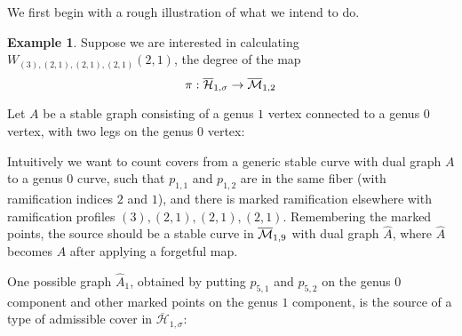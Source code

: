 \documentclass[thesis]{thesis-umich}           %
\newcommand{\Hb}{\overline{\mathcal H}}
\theoremstyle{definition}
\newtheorem{eg}[thm]{Example}
\begin{document}
We first begin with a rough illustration of what we intend to do.

\begin{eg}
  \label{eg:fourtorsion}
  Suppose we are interested in calculating $W_{(3),(2,1),(2,1),(2,1)}(2,1)$, the degree of the map
  \[
  \pi:\Hb_{1,\sigma}\to\mb_{1,2}
  \]
  
  Let $A$ be a stable graph consisting of a genus $1$ vertex connected to a genus $0$ vertex, with two legs on the
  genus $0$ vertex:

  

  Intuitively we want to count covers from a generic stable curve with dual graph $A$ to a genus $0$
  curve, such that $p_{1,1}$ and $p_{1,2}$ are in the same fiber (with ramification indices $2$ and $1$),
  and there is marked ramification elsewhere with ramification profiles $(3),(2,1),(2,1),(2,1)$.
  Remembering the marked points, the source should be a stable curve in $\mb_{1,9}$ with dual graph $\hat A$, where $\hat A$
  becomes $A$ after applying a forgetful map.

  One possible graph $\hat A_1$, obtained by putting $p_{5,1}$ and $p_{5,2}$ on the genus $0$ component and other
  marked points on the genus $1$ component, is the source of a type of admissible cover in $\Hb_{1,\sigma}$:

                  \begin{tikzpicture}[thick,amat/.style={matrix of nodes,nodes in empty cells,
  row sep=2.5em,rounded corners,
  nodes={draw,solid,circle,minimum size=1.0cm}},
  dmat/.style={matrix of nodes,nodes in empty cells,row sep=2.5em,nodes={minimum size=1.0cm},draw=myred},
  fsnode/.style={fill=myblue},
  ssnode/.style={fill=mygreen}]


\end{tikzpicture}
\end{eg}
\end{document}
